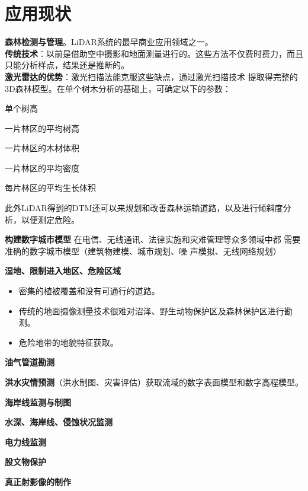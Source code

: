 \section{应用现状}
\begin{enumerate*}
	\item %
	\textbf{森林检测与管理}。LiDAR系统的最早商业应用领域之一。\\
	\textbf{传统技术}：以前是借助空中摄影和地面测量进行的。这些方法不仅费时费力，而且只能分析样点，结果还是推断的。\\
	\textbf{激光雷达的优势}：激光扫描法能克服这些缺点，通过激光扫描技术
	提取得完整的3D森林模型。在单个树木分析的基础上，可确定以下的参数：\begin{itemize*}
		\item 单个树高
		\item 一片林区的平均树高
		\item 一片林区的木材体积
		\item 一片林区的平均密度
		\item 每片林区的平均生长体积
	\end{itemize*} 
	此外LiDAR得到的DTM还可以来规划和改善森林运输道路，以及进行倾斜度分析，以便测定危险。
	\item %
	\textbf{构建数字城市模型}
	在电信、无线通讯、法律实施和灾难管理等众多领域中都
	需要准确的数字城市模型（建筑物建模、城市规划、噪
	声模拟、无线网络规划）
	\item %
	\textbf{湿地、限制进入地区、危险区域}
	\begin{itemize}
		\item 密集的植被覆盖和没有可通行的道路。
		\item 传统的地面摄像测量技术很难对沼泽、野生动物保护区及森林保护区进行勘测。
		\item 危险地带的地貌特征获取。
	\end{itemize}
	\item \textbf{油气管道勘测}
	\item \textbf{洪水灾情预测}（洪水制图、灾害评估）获取流域的数字表面模型和数字高程模型。
	\item \textbf{海岸线监测与制图}
	\item \textbf{水深、海岸线、侵蚀状况监测}
	\item \textbf{电力线监测}
	\item \textbf{股文物保护}
	\item \textbf{真正射影像的制作}
\end{enumerate*}

